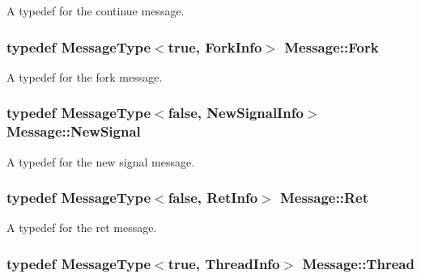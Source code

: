 A typedef for the continue message. 

\subsubsection[{\texorpdfstring{Fork}{Fork}}]{\setlength{\rightskip}{0pt plus 5cm}typedef {\bf Message\+Type}$<$true, {\bf Fork\+Info}$>$ {\bf Message\+::\+Fork}}\hypertarget{class_message_ad1eca09e5cd0c92f940f51b847dd7f14}{}\label{class_message_ad1eca09e5cd0c92f940f51b847dd7f14}


A typedef for the fork message. 

\subsubsection[{\texorpdfstring{New\+Signal}{NewSignal}}]{\setlength{\rightskip}{0pt plus 5cm}typedef {\bf Message\+Type}$<$false, {\bf New\+Signal\+Info}$>$ {\bf Message\+::\+New\+Signal}}\hypertarget{class_message_a9f57a1ee0e722668e9101b737d7c9844}{}\label{class_message_a9f57a1ee0e722668e9101b737d7c9844}


A typedef for the new signal message. 

\subsubsection[{\texorpdfstring{Ret}{Ret}}]{\setlength{\rightskip}{0pt plus 5cm}typedef {\bf Message\+Type}$<$false, {\bf Ret\+Info}$>$ {\bf Message\+::\+Ret}}\hypertarget{class_message_a146628035f5a0723cb04f7a328858e34}{}\label{class_message_a146628035f5a0723cb04f7a328858e34}


A typedef for the ret message. 

\subsubsection[{\texorpdfstring{Thread}{Thread}}]{\setlength{\rightskip}{0pt plus 5cm}typedef {\bf Message\+Type}$<$true, {\bf Thread\+Info}$>$ {\bf Message\+::\+Thread}}\hypertarget{class_message_ad3f3fae0323770c88017fc75b50682d1}{}\label{class_message_ad3f3fae0323770c88017fc75b50682d1}


